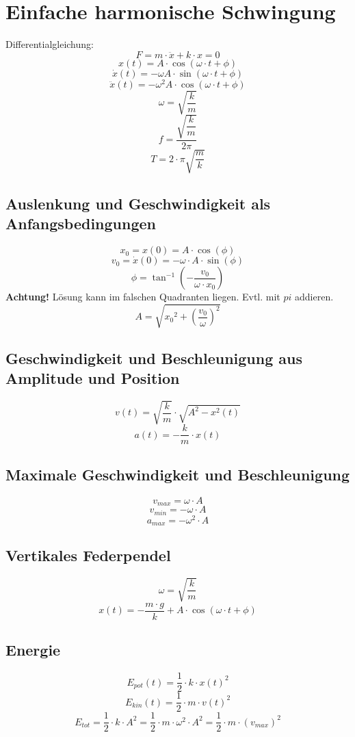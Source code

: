 \section{Einfache harmonische Schwingung}
Differentialgleichung: 
\[ \boxed{F = m \cdot \ddot{x} + k \cdot x = 0} \]
\[ \boxed{x(t) = A \cdot \cos(\omega \cdot t + \phi)} \]
\[ \boxed{\dot{x}(t) = - \omega A \cdot \sin(\omega \cdot t + \phi)} \]
\[ \boxed{\ddot{x}(t) = - \omega^2 A \cdot \cos(\omega \cdot t + \phi)} \]
\[ \boxed{\omega = \sqrt{\frac{k}{m}}} \]
\[ \boxed{f = \frac{\sqrt{\dfrac{k}{m}}}{2 \pi}} \]
\[ \boxed{T = 2 \cdot \pi \sqrt{\frac{m}{k}}} \]

\subsection{Auslenkung und Geschwindigkeit als Anfangsbedingungen}
\[ \boxed{x_0 = x(0) = A \cdot \cos(\phi)} \]
\[ \boxed{v_0 = \dot{x}(0) = - \omega \cdot A \cdot \sin(\phi)} \]
\[ \boxed{\phi = \tan^{-1}\left(-\frac{v_0}{\omega \cdot x_0}\right)} \]
\textbf{Achtung!} Lösung kann im falschen Quadranten liegen. 
Evtl. mit $pi$ addieren. 
\[ \boxed{A = \sqrt{{x_0}^2 + \left(\frac{v_0}{\omega}\right)^2}} \]

\subsection{Geschwindigkeit und Beschleunigung aus Amplitude und Position}
\[ \boxed{v(t) = \sqrt{\frac{k}{m}} \cdot \sqrt{A^2 - x^2(t)}} \]
\[ \boxed{a(t) = - \frac{k}{m} \cdot x(t)} \]

\subsection{Maximale Geschwindigkeit und Beschleunigung}
\[ \boxed{v_{max} = \omega \cdot A} \]
\[ \boxed{v_{min} = -\omega \cdot A} \]
\[ \boxed{a_{max} = -\omega^2 \cdot A} \]

\subsection{Vertikales Federpendel}
\[ \boxed{\omega = \sqrt{\frac{k}{m}}} \]
\[ \boxed{x(t) = - \frac{m \cdot g}{k} + A \cdot \cos(\omega \cdot t + \phi)} \]

\subsection{Energie}
\[ \boxed{E_{pot}(t) = \frac{1}{2} \cdot k \cdot x(t)^2} \]
\[ \boxed{E_{kin}(t) = \frac{1}{2} \cdot m \cdot v(t)^2} \]
\[ \boxed{E_{tot} = \frac{1}{2} \cdot k \cdot A^2 
= \frac{1}{2} \cdot m \cdot \omega^2 \cdot A^2 
= \frac{1}{2} \cdot m \cdot (v_{max})^2} \]


